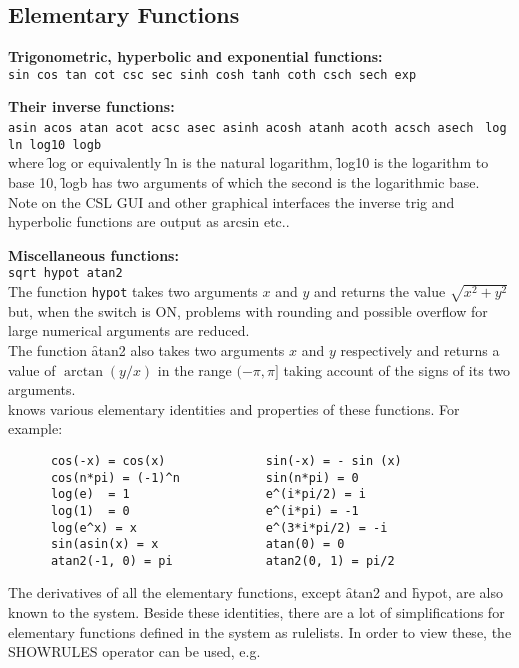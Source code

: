 \subsection{Elementary Functions}
\textbf{Trigonometric, hyperbolic and exponential functions:}\\
\texttt{sin cos tan cot csc sec sinh cosh tanh coth csch sech exp}

\textbf{Their inverse functions:}\\
\texttt{asin acos atan  acot acsc asec asinh acosh atanh acoth acsch asech}
\texttt{ log ln log10 logb}\\
where \f{log} or equivalently \f{ln} is the natural logarithm,
\f{log10} is the logarithm to base 10,
\f{logb} has two arguments of which the second is the logarithmic base.
Note on the CSL GUI and other graphical interfaces the inverse trig and
hyperbolic functions are output as $\mathrm{arcsin}$ etc..

\textbf{Miscellaneous functions:}\\
\texttt{sqrt  hypot  atan2}\\
The function \texttt{hypot} takes two arguments $x$  and $y$ and
returns the value $\sqrt{x^2+y^2}$ but, when the switch  is ON, 
problems with rounding and possible overflow for large  numerical arguments
are reduced.\\
The function \f{atan2} also takes two
arguments $x$ and $y$ respectively and returns a value of $\arctan(y/x)$ in
the range $(-\pi, \pi]$ taking account of the signs of its two arguments.\\
  

{\REDUCE} knows various elementary identities and properties
of these functions. For example:
\begin{verbatim}
      cos(-x) = cos(x)              sin(-x) = - sin (x)
      cos(n*pi) = (-1)^n            sin(n*pi) = 0
      log(e)  = 1                   e^(i*pi/2) = i
      log(1)  = 0                   e^(i*pi) = -1
      log(e^x) = x                  e^(3*i*pi/2) = -i
      sin(asin(x) = x               atan(0) = 0
      atan2(-1, 0) = pi             atan2(0, 1) = pi/2
\end{verbatim}

The derivatives of all the elementary  functions, except \f{atan2} and
\f{hypot}, are also known to the system.
Beside these identities, there are a lot of simplifications
for elementary functions
defined in the {\REDUCE} system as rulelists. In order to
view these, the SHOWRULES operator can be used, e.g.

